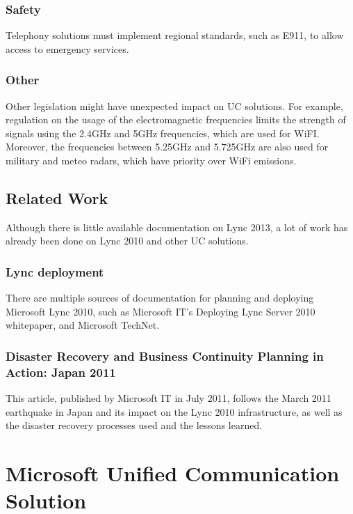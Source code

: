 \subsection{Safety}
Telephony solutions must implement regional standards, such as E911, to allow access to emergency services\cite{_voip_????}.

\subsection{Other}
Other legislation might have unexpected impact on UC solutions. For example, regulation on the usage of the electromagnetic frequencies limits the strength of signals using the 2.4GHz and 5GHz frequencies, which are used for WiFI. Moreover, the frequencies between 5.25GHz and 5.725GHz are also used for military and meteo radars, which have priority over WiFi emissions\cite{arcep_reseaux_????}.


\section{Related Work}

Although there is little available documentation on Lync 2013, a lot of work has already been done on Lync 2010 and other UC solutions.

\subsection{Lync deployment}
There are multiple sources of documentation for planning and deploying Microsoft Lync 2010, such as Microsoft IT's Deploying Lync Server 2010 whitepaper\cite{microsoft_it_showcase_deploying_2011}, and Microsoft TechNet\cite{microsoft_technet_microsoft_2013}.


\subsection{Disaster Recovery and Business Continuity Planning in Action: Japan 2011}
This article, published by Microsoft IT in July 2011, follows the March 2011 earthquake in Japan and its impact on the Lync 2010 infrastructure, as well as the disaster recovery processes used and the lessons learned\cite{microsoft_it_showcase_disaster_2011}.

\chapter{Microsoft Unified Communication Solution}\label{chapter_ms_UC}
